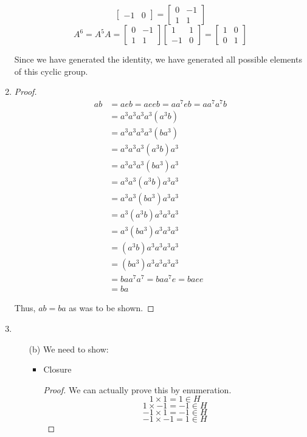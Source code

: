 \documentclass[12pt,letterpaper]{article}
\begin{document}
\begin{enumerate}
\[\begin{bmatrix}
          -1 & 0
        \end{bmatrix}
        =
        \begin{bmatrix}
          0  & -1 \\
          1  & 1
        \end{bmatrix}
      \]
      \[
        A^6 = A^5A =
        \begin{bmatrix}
          0  & -1 \\
          1  & 1
        \end{bmatrix}
        \begin{bmatrix}
          1  & 1  \\
          -1 & 0
        \end{bmatrix}
        =
        \begin{bmatrix}
          1  & 0  \\
          0  & 1
        \end{bmatrix}
      \]

      Since we have generated the identity,
      we have generated all possible elements of this cyclic group.

    \item
      \begin{proof}
        \begin{align*}
          ab &= aeb = aeeb = aa^7eb = aa^7a^7b \\
          &= a^3a^3a^3a^3(a^3b) \\
          &= a^3a^3a^3a^3(ba^3) \\
          &= a^3a^3a^3(a^3b)a^3 \\
          &= a^3a^3a^3(ba^3)a^3 \\
          &= a^3a^3(a^3b)a^3a^3 \\
          &= a^3a^3(ba^3)a^3a^3 \\
          &= a^3(a^3b)a^3a^3a^3 \\
          &= a^3(ba^3)a^3a^3a^3 \\
          &= (a^3b)a^3a^3a^3a^3 \\
          &= (ba^3)a^3a^3a^3a^3 \\
          &= baa^7a^7 = baa^7e = baee\\
          &= ba
        \end{align*}

        Thus, $ab=ba$ as was to be shown.
      \end{proof}

    \item
      \begin{enumerate}
        \item[(b)]
          We need to show:
          \begin{itemize}
            \item Closure
              \begin{proof}
                We can actually prove this by enumeration.
                \[1 \times 1 = 1 \in H\]
                \[1 \times -1 = -1 \in H\]
                \[-1 \times 1 = -1 \in H\]
                \[-1 \times -1 = 1 \in H\]


\end{proof}
\end{itemize}
\end{enumerate}
\end{enumerate}
\end{document}
